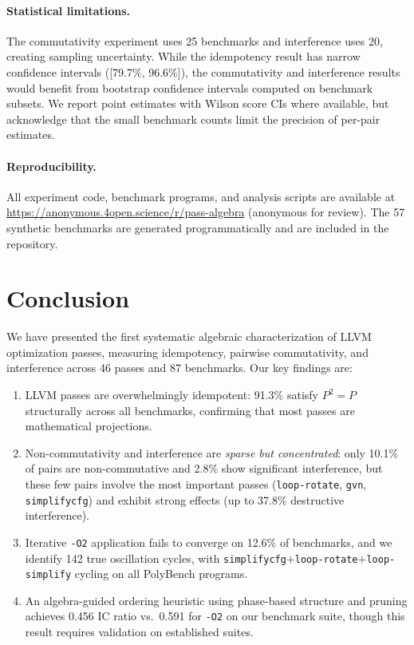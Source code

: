 \documentclass[11pt]{article}
\begin{document}
\paragraph{Statistical limitations.}
The commutativity experiment uses 25 benchmarks and interference uses 20, creating sampling uncertainty. While the idempotency result has narrow confidence intervals ([79.7\%, 96.6\%]), the commutativity and interference results would benefit from bootstrap confidence intervals computed on benchmark subsets. We report point estimates with Wilson score CIs where available, but acknowledge that the small benchmark counts limit the precision of per-pair estimates.

\paragraph{Reproducibility.}
All experiment code, benchmark programs, and analysis scripts are available at \url{https://anonymous.4open.science/r/pass-algebra} (anonymous for review). The 57 synthetic benchmarks are generated programmatically and are included in the repository.

\section{Conclusion}
\label{sec:conclusion}

We have presented the first systematic algebraic characterization of LLVM optimization passes, measuring idempotency, pairwise commutativity, and interference across 46 passes and 87 benchmarks. Our key findings are:

\begin{enumerate}[nosep]
  \item LLVM passes are overwhelmingly idempotent: 91.3\% satisfy $P^2 = P$ structurally across all benchmarks, confirming that most passes are mathematical projections.
  \item Non-commutativity and interference are \emph{sparse but concentrated}: only 10.1\% of pairs are non-commutative and 2.8\% show significant interference, but these few pairs involve the most important passes (\texttt{loop-rotate}, \texttt{gvn}, \texttt{simplifycfg}) and exhibit strong effects (up to 37.8\% destructive interference).
  \item Iterative \texttt{-O2} application fails to converge on 12.6\% of benchmarks, and we identify 142 true oscillation cycles, with \texttt{simplifycfg}$+$\texttt{loop-rotate}$+$\texttt{loop-simplify} cycling on all PolyBench programs.
  \item An algebra-guided ordering heuristic using phase-based structure and pruning achieves 0.456 IC ratio vs.\ 0.591 for \texttt{-O2} on our benchmark suite, though this result requires validation on established suites.
\end{enumerate}
\end{document}
